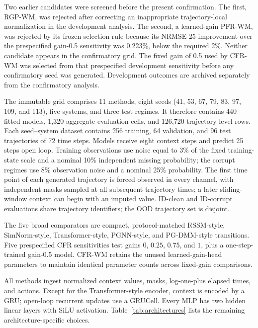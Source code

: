 Two earlier candidates were screened before the present confirmation. The first, RGP-WM, was rejected after correcting an inappropriate trajectory-local normalization in the development analysis. The second, a learned-gain PFR-WM, was rejected by its frozen selection rule because its NRMSE-25 improvement over the prespecified gain-0.5 sensitivity was 0.223\%, below the required 2\%. Neither candidate appears in the confirmatory grid. The fixed gain of 0.5 used by CFR-WM was selected from that prespecified development sensitivity before any confirmatory seed was generated. Development outcomes are archived separately from the confirmatory analysis.

The immutable grid comprises 11 methods, eight seeds (41, 53, 67, 79, 83, 97, 109, and 113), five systems, and three test regimes. It therefore contains 440 fitted models, 1,320 aggregate evaluation cells, and 126,720 trajectory-level rows. Each seed--system dataset contains 256 training, 64 validation, and 96 test trajectories of 72 time steps. Models receive eight context steps and predict 25 steps open loop. Training observations use noise equal to 3\% of the fixed training-state scale and a nominal 10\% independent missing probability; the corrupt regimes use 8\% observation noise and a nominal 25\% probability. The first time point of each generated trajectory is forced observed in every channel, with independent masks sampled at all subsequent trajectory times; a later sliding-window context can begin with an imputed value. ID-clean and ID-corrupt evaluations share trajectory identifiers; the OOD trajectory set is disjoint.

The five broad comparators are compact, protocol-matched RSSM-style,
SimNorm-style, Transformer-style, PGNN-style, and PG-DMM-style transitions. Five
prespecified CFR sensitivities test gains $0$, $0.25$, $0.75$, and $1$, plus a
one-step-trained gain-0.5 model. CFR-WM retains the unused learned-gain-head
parameters to maintain identical parameter counts across fixed-gain comparisons.

All methods ingest normalized context values, masks, log-one-plus elapsed times,
and actions. Except for the Transformer-style encoder, context is encoded by a
GRU; open-loop recurrent updates use a GRUCell. Every MLP has two hidden linear
layers with SiLU activation. Table~\ref{tab:architectures} lists the remaining
architecture-specific choices.

